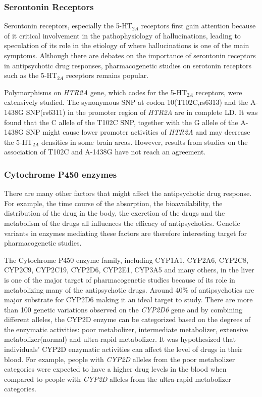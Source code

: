 	\subsubsection{Serontonin Receptors}
	Serontonin receptors, especially the 5-HT$_{2A}$ receptors first gain attention because of it critical involvement in the pathophysiology of hallucinations\citep{Aghajanian1999}, leading to speculation of its role in the etiology of  where hallucinations is one of the main symptoms.
	Although there are debates on the importance of serontonin receptors in antipsychotic drug responses\citep{Kapur2003}, pharmacogenetic studies on serotonin receptors such as the 5-HT$_{2A}$ receptors remains popular.
	
	Polymorphisms on \textit{HTR2A} gene, which codes for the 5-HT$_{2A}$ receptors, were extensively studied. 
	The synonymous \gls{SNP} at codon 10(T102C,rs6313) and the A-1438G \gls{SNP}(rs6311) in the promoter region of \textit{HTR2A} are in complete \gls{LD}. 
	It was found that the C allele of the T102C \gls{SNP}, together with the G allele of the A-1438G \gls{SNP} might cause lower promoter activities of \textit{HTR2A} and may decrease the 5-HT$_{2A}$ densities in some brain areas\citep{Zhang2011}.
	However, results from studies on the association of T102C and A-1438G have not reach an agreement\citep{Zhang2011}.
	
	\subsubsection{Cytochrome P450 enzymes}
	There are many other factors that might affect the antipsychotic drug response.
	For example, the time course of the absorption, the bioavailability, the distribution of the drug in the body, the excretion of the drugs and the metabolism of the drugs all influences the efficacy of antipsychotics.
	Genetic variants in enzymes mediating these factors are therefore interesting target for pharmacogenetic studies.
	
	The Cytochrome P450 enzyme family, including CYP1A1, CYP2A6, CYP2C8,
	CYP2C9, CYP2C19, CYP2D6, CYP2E1, CYP3A5 and many others,  in the liver is one of the major target of pharmacogenetic studies because of its role in metabolizing many of the antipsychotic drugs\citep{Cacabelos2011}.
	Around 40\% of antipsychotics are major substrate for CYP2D6\citep{Cacabelos2011} making it an ideal target to study.
	There are more than 100 genetic variations observed on the \textit{CYP2D6} gene and by combining different alleles, the CYP2D enzyme can be categorized based on the degrees of the enzymatic activities: poor metabolizer, intermediate metabolizer, extensive metabolizer(normal) and ultra-rapid metabolizer\citep{Zhang2011}.
	It was hypothesized that individuals' CYP2D enzymatic activities can affect the level of drugs in their blood. 
	For example, people with \textit{CYP2D} alleles from the poor metabolizer categories were expected to have a higher drug levels in the blood when compared to people with \textit{CYP2D} alleles from the ultra-rapid metabolizer categories.
	
